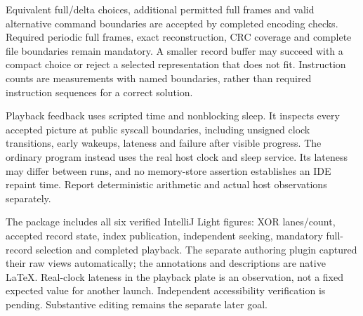 Equivalent full/delta choices, additional permitted full frames and valid alternative
command boundaries are accepted by completed encoding checks. Required periodic
full frames, exact reconstruction, CRC coverage and complete file boundaries remain
mandatory. A smaller record buffer may succeed with a compact choice or reject a
selected representation that does not fit. Instruction counts are measurements with
named boundaries, rather than required instruction sequences for a correct solution.

Playback feedback uses scripted time and nonblocking sleep. It inspects every accepted
picture at public syscall boundaries, including unsigned clock transitions, early
wakeups, lateness and failure after visible progress. The ordinary program instead
uses the real host clock and sleep service. Its lateness may differ between runs,
and no memory-store assertion establishes an IDE repaint time. Report deterministic
arithmetic and actual host observations separately.

The package includes all six verified IntelliJ Light figures: XOR lanes/count,
accepted record state, index publication, independent seeking, mandatory full-record
selection and completed playback. The separate authoring plugin captured their raw
views automatically; the annotations and descriptions are native LaTeX. Real-clock
lateness in the playback plate is an observation, not a fixed expected value for
another launch. Independent accessibility verification is pending. Substantive
editing remains the separate later goal.
